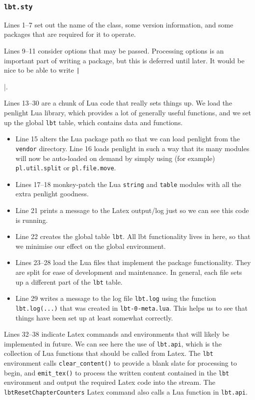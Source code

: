 \documentclass[11pt]{article}
\newcommand{\lbtlabel}{\textsf{lbt}}
\newcommand{\lbtpkg}{\texttt{lbt}}
\begin{document}

\subsubsection{\texttt{lbt.sty}}

Lines 1--7 set out the name of the class, some version information, and some packages that are required for it to operate.

Lines 9--11 consider options that may be passed. Processing options is an important part of writing a package, but this is deferred until later. It would be nice to be able to write \texttt|\usepackage[draft]{lbt}|.

Lines 13--30 are a chunk of Lua code that really sets things up. We load the \textsf{penlight} Lua library, which provides a lot of generally useful functions, and we set up the global \lbtpkg{} table, which contains data and functions.
\begin{itemize}
  \item Line 15 alters the Lua package path so that we can load \textsf{penlight} from the \texttt{vendor} directory. Line 16 loads \textsf{penlight} in such a way that its many modules will now be auto-loaded on demand by simply using (for example) \texttt{pl.util.split} or \texttt{pl.file.move}.
  \item Lines 17--18 monkey-patch the Lua \texttt{string} and \texttt{table} modules with all the extra \textsf{penlight} goodness.
  \item Line 21 prints a message to the Latex output/log just so we can see this code is running.
  \item Line 22 creates the global table \lbtpkg{}. All \lbtlabel{} functionality lives in here, so that we minimise our effect on the global environment.
  \item Lines 23--28 load the Lua files that implement the package functionality. They are split for ease of development and maintenance. In general, each file sets up a different part of the \lbtpkg{} table.
  \item Line 29 writes a message to the log file \texttt{lbt.log} using the function \texttt{lbt.log(...)} that was created in \texttt{lbt-0-meta.lua}. This helps us to see that things have been set up at least somewhat correctly.
\end{itemize}

Lines 32--38 indicate Latex commands and environments that will likely be implemented in future. We can see here the use of \texttt{lbt.api}, which is the collection of Lua functions that should be called from Latex. The \lbtpkg{} environment calls \texttt{clear\_content()} to provide a blank slate for processing to begin, and \texttt{emit\_tex()} to process the written content contained in the \lbtpkg{} environment and output the required Latex code into the stream. The \texttt{lbtResetChapterCounters} Latex command also calls a Lua function in \texttt{lbt.api}.
\end{document}
